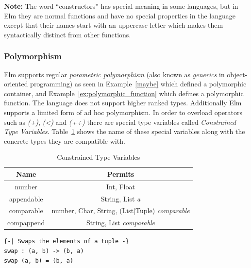 \documentclass[../thesis.tex]{subfiles}
\begin{document}
\textbf{Note:}
The word ``constructors'' has special meaning in some languages, but in Elm they
are normal functions and have no special properties in the language
except that their names start with an uppercase letter which makes them syntactically distinct
from other functions.

\subsubsection{Polymorphism}
Elm supports regular \textit{parametric polymorphism} (also known as \textit{generics} in object-oriented programming)
as seen in Example~\ref{maybe} which defined a polymorphic container, and Example~\ref{ex:polymorphic_function}
which defines a polymorphic function.
The language does not support higher ranked types.
Additionally Elm supports a limited form of ad hoc polymorphism.
In order to overload operators such as \textit{(+)}, \textit{(<)} and \textit{(++)}
there are special type variables called \textit{Constrained Type Variables}.
Table~\ref{tab:ctv} shows the name of these special variables along with the
concrete types they are compatible with.
\begin{table}[htpb]
    \centering
    \label{tab:ctv}
    \begin{tabular}{c|c}
        Name & Permits \\
        \hline
        number & Int, Float \\
        appendable & String, List \textit{a} \\
        comparable & number, Char, String, (List|Tuple) \textit{comparable} \\
        compappend & String, List \textit{comparable} \\
    \end{tabular}
    \caption{Constrained Type Variables}
\end{table}
\begin{example}\label{ex:polymorphic_function}
\begin{verbatim}
{-| Swaps the elements of a tuple -}
swap : (a, b) -> (b, a)
swap (a, b) = (b, a)
\end{verbatim}
\end{example}
\end{document}
